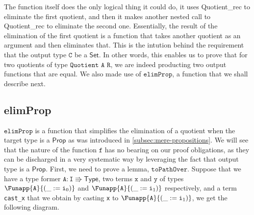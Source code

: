 \documentclass[12pt,twoside,maitrise]{dms}
\theoremstyle{definition}
\numberwithin{equation}{section}
\numberwithin{table}{chapter}
\numberwithin{figure}{chapter}
\newcommand\kw[1] {\textsf{#1}}
\newcommand\id[1] {\texttt{#1}}
\begin{document}
The function itself does the only logical thing it could do, it uses
\kw{Quotient\_rec} to eliminate the first quotient, and then it makes another
nested call to \kw{Quotient\_rec} to eliminate the second one. Essentially, the
result of the elimination of the first quotient is a function that takes another
quotient as an argument and then eliminates that. This is the intution behind
the requirement that the output type $\id{C}$ be a $\kw{Set}$. In other words,
this enables us to prove that for two quotients of type $\id{Quotient A R}$, we
are indeed producting two output functions that are equal. We also made use of
$\id{elimProp}$, a function that we shall describe next.

\subsection*{elimProp}
$\id{elimProp}$ is a function that simplifies the elimination of a quotient when
the target type is a $\kw{Prop}$ as was introduced in
\autoref{subsec:mere-propositions}. We will see that the nature of the function
$\id{f}$ has no bearing on our proof obligations, as they can be discharged in a
very systematic way by leveraging the fact that output type is a $\kw{Prop}$.
First, we need to prove a lemma, $\id{toPathOver}$. Suppose that we have a type
former $\id{A} \colon \id{I} \Rrightarrow \kw{Type}$, two terms $\id{x}$ and
$\id{y}$ of types $\Funapp{\id{A}}{(\earg{\_}{\ileft})}$ and
$\Funapp{\id{A}}{(\earg{\_}{\iright})}$ respectively, and a term \id{cast\_x}
that we obtain by casting \id{x} to $\Funapp{\id{A}}{(\earg{\_}{\iright})}$, we
get the following diagram.
\end{document}
